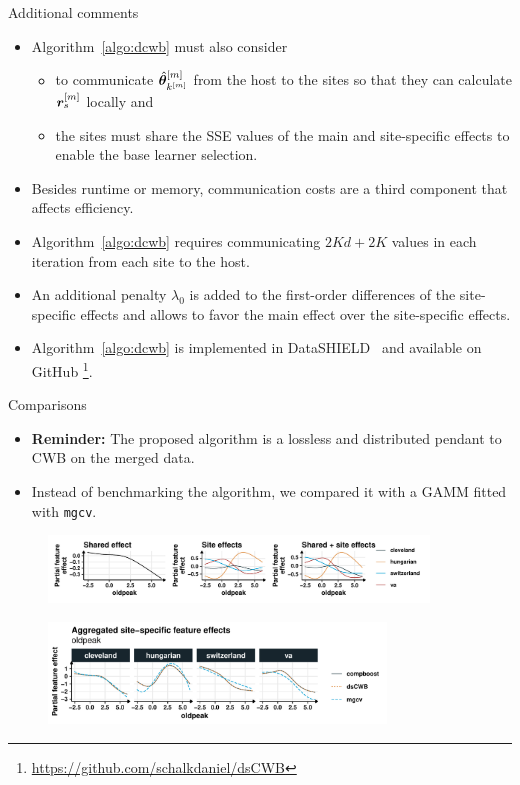 \documentclass[t,10pt]{beamer}
\begin{document}
\begin{frame}{Additional comments}
  \begin{itemize}
    \item
      Algorithm~\ref{algo:dcwb} must also consider
      \begin{itemize}
          \item to communicate $\hat{\bm{\theta}}^{[m]}_{k^{[m]}}$ from the host to the sites so that they can calculate $\bm{r}^{[m]}_s$ locally and
          \item the sites must share the SSE values of the main and site-specific effects to enable the base learner selection.
      \end{itemize}
    \item
      Besides runtime or memory, communication costs are a third component that affects efficiency. 
    \item
      Algorithm~\ref{algo:dcwb} requires communicating $2Kd + 2K$ values in each iteration from each site to the host.
    \item
      An additional penalty $\lambda_0$ is added to the first-order differences of the site-specific effects and allows to favor the main effect over the site-specific effects.
    \item
      Algorithm~\ref{algo:dcwb} is implemented in DataSHIELD~\citep{gaye2014datashield} and available on GitHub \footnote[frame,1]{\url{https://github.com/schalkdaniel/dsCWB}}.
  \end{itemize}
\end{frame}


\begin{frame}{Comparisons}
  \begin{itemize}
    \item \textbf{Reminder:} The proposed algorithm is a lossless and distributed pendant to CWB on the merged data.
    \item Instead of benchmarking the algorithm, we compared it with a GAMM fitted with \texttt{mgcv}.
  \end{itemize}
  \begin{figure}
    \centering
    \includegraphics[width=0.9\textwidth]{figures/fig-dcwb-effect-decomposition.pdf}
  \end{figure}
  \vspace{-0.2cm}
  \begin{figure}
    \centering
    \includegraphics[width=0.8\textwidth]{figures/fig-dcwb-effect-comparison.pdf}
  \end{figure}
\end{frame}
\end{document}
